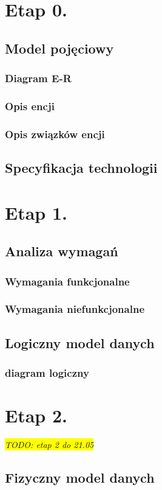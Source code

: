 \documentclass{article}
\newcommand{\todo}[1]{
	\colorbox{yellow} {{\color{red}
	\emph {TODO: #1}
}}}
\begin{document}
\section{Etap 0. \label{s0}}
\subsection{Model pojęciowy}
\subsubsection{Diagram E-R}
\subsubsection{Opis encji}
\subsubsection{Opis związków encji}
\subsection{Specyfikacja technologii}
\section{Etap 1.\label{s1}}
\subsection{Analiza wymagań}
\subsubsection{Wymagania funkcjonalne}
\subsubsection{Wymagania niefunkcjonalne}
\subsection{Logiczny model danych}
\subsubsection{diagram logiczny}
\section{Etap 2. \label{s2}}
\todo{etap 2 do 21.05}
\subsection{Fizyczny model danych}
\end{document}
